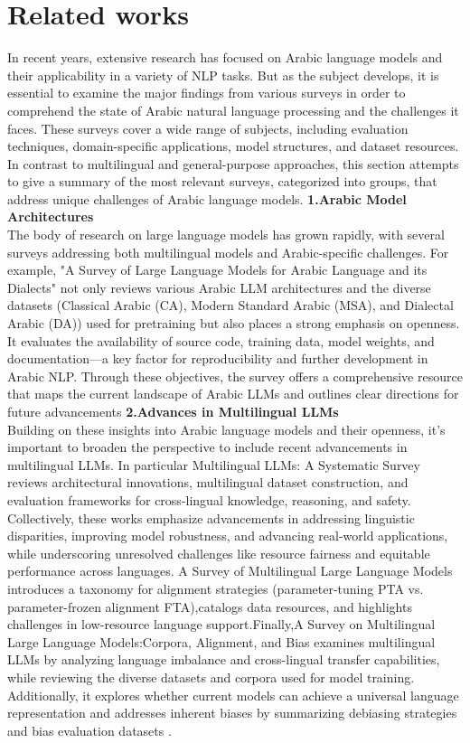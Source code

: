 \documentclass[runningheads]{llncs}
\begin{document}
\section{Related works}
In recent years, extensive research has focused on Arabic language models and their applicability in a variety of NLP tasks. But as the subject develops, it is essential to examine the major findings from various surveys in order to comprehend the state of Arabic natural language processing and the challenges it faces. These surveys cover a wide range of subjects, including evaluation techniques, domain-specific applications, model structures, and dataset resources. In contrast to multilingual and general-purpose approaches, this section attempts to give a summary of the most relevant surveys, categorized into groups, that address unique challenges of Arabic language models. \newline
\textbf{1.Arabic Model Architectures }\\
The body of research on large language models has grown rapidly, with several surveys addressing both multilingual models and Arabic-specific challenges. For example, "A Survey of Large Language Models for Arabic Language and its Dialects"\cite{ref_proc10} not only reviews various Arabic LLM architectures and the diverse datasets (Classical Arabic (CA), Modern Standard Arabic (MSA), and Dialectal Arabic (DA)) used for pretraining but also places a strong emphasis on openness. It evaluates the availability of source code, training data, model weights, and documentation—a key factor for reproducibility and further development in Arabic NLP. Through these objectives, the survey offers a comprehensive resource that maps the current landscape of Arabic LLMs and outlines clear directions for future advancements\newline
\textbf{2.Advances in Multilingual LLMs}\\
Building on these insights into Arabic language models and their openness, it's important to broaden the perspective to include recent advancements in multilingual LLMs. In particular Multilingual LLMs: A Systematic Survey\cite{Zhu2024} reviews architectural innovations, multilingual dataset construction, and evaluation frameworks for cross-lingual knowledge, reasoning, and safety. Collectively, these works emphasize advancements in addressing linguistic disparities, improving model robustness, and advancing real-world applications, while underscoring unresolved challenges like resource fairness and equitable performance across languages. A Survey of Multilingual Large Language Models\cite{ref_proc11} introduces a taxonomy for alignment strategies (parameter-tuning PTA vs. parameter-frozen alignment FTA),catalogs data resources, and highlights challenges in low-resource language support.Finally,A Survey on Multilingual Large Language Models:Corpora, Alignment, and Bias \cite{ref_proc12}examines multilingual LLMs by analyzing language imbalance and cross-lingual transfer capabilities, while reviewing the diverse datasets and corpora used for model training. Additionally, it explores whether current models can achieve a universal language representation and addresses inherent biases by summarizing debiasing strategies and bias evaluation datasets .\\
\end{document}
